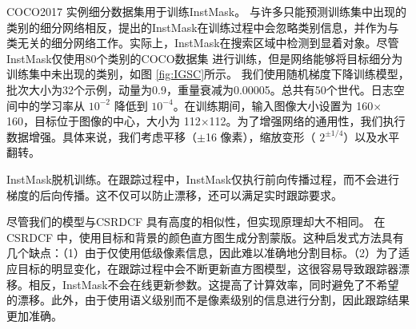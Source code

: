 COCO2017 \cite{COCO} 实例细分数据集用于训练InstMask。
与许多只能预测训练集中出现的类别的细分网络相反，提出的InstMask在训练过程中会忽略类别信息，并作为与类无关的细分网络工作。实际上，InstMask在搜索区域中检测到显着对象。尽管InstMask仅使用80个类别的COCO数据集 \cite{COCO} 进行训练，但是网络能够将目标细分为训练集中未出现的类别，如图 \ref{fig:IGSC}所示。
我们使用随机梯度下降训练模型，批次大小为32个示例，动量为0.9，重量衰减为0.00005。总共有50个世代。日志空间中的学习率从 $10^{-2}$ 降低到 $10^{-4}$。在训练期间，输入图像大小设置为 160$\times$160，目标位于图像的中心，大小为 112$\times$112。为了增强网络的通用性，我们执行数据增强。具体来说，我们考虑平移（$\pm$16 像素），缩放变形（ $2^{\pm 1/4}$）以及水平翻转。

InstMask脱机训练。在跟踪过程中，InstMask仅执行前向传播过程，而不会进行梯度的后向传播。这不仅可以防止漂移，还可以满足实时跟踪要求。

尽管我们的模型与CSRDCF \cite{Lukezic2017DiscriminativeCF}具有高度的相似性，但实现原理却大不相同。
在CSRDCF \cite{Lukezic2017DiscriminativeCF}中，使用目标和背景的颜色直方图生成分割蒙版。这种启发式方法具有几个缺点：（1）由于仅使用低级像素信息，因此难以准确地分割目标。（2）为了适应目标的明显变化，在跟踪过程中会不断更新直方图模型，这很容易导致跟踪器漂移。相反，InstMask不会在线更新参数。这提高了计算效率，同时避免了不希望的漂移。此外，由于使用语义级别而不是像素级别的信息进行分割，因此跟踪结果更加准确。

